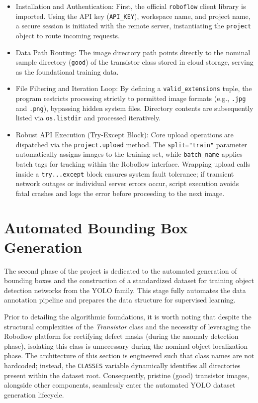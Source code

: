 \documentclass{article}
\begin{document}
\begin{itemize}
	\item Installation and Authentication: First, the official \texttt{roboflow} client library is imported. Using the API key (\texttt{API\_KEY}), workspace name, and project name, a secure session is initiated with the remote server, instantiating the \texttt{project} object to route incoming requests.
	\item Data Path Routing: The image directory path points directly to the nominal sample directory (\texttt{good}) of the transistor class stored in cloud storage, serving as the foundational training data.
	\item File Filtering and Iteration Loop: By defining a \texttt{valid\_extensions} tuple, the program restricts processing strictly to permitted image formats (e.g., \texttt{.jpg} and \texttt{.png}), bypassing hidden system files. Directory contents are subsequently listed via \texttt{os.listdir} and processed iteratively.
	\item Robust API Execution (Try-Except Block): Core upload operations are dispatched via the \texttt{project.upload} method. The \texttt{split="train"} parameter automatically assigns images to the training set, while \texttt{batch\_name} applies batch tags for tracking within the Roboflow interface. Wrapping upload calls inside a \texttt{try...except} block ensures system fault tolerance; if transient network outages or individual server errors occur, script execution avoids fatal crashes and logs the error before proceeding to the next image.
\end{itemize}


\section{Automated Bounding Box Generation}

The second phase of the project is dedicated to the automated generation of bounding boxes and the construction of a standardized dataset for training object detection networks from the YOLO family. This stage fully automates the data annotation pipeline and prepares the data structure for supervised learning.

Prior to detailing the algorithmic foundations, it is worth noting that despite the structural complexities of the \textit{Transistor} class and the necessity of leveraging the Roboflow platform for rectifying defect masks (during the anomaly detection phase), isolating this class is unnecessary during the nominal object localization phase. The architecture of this section is engineered such that class names are not hardcoded; instead, the \texttt{CLASSES} variable dynamically identifies all directories present within the dataset root. Consequently, pristine (good) transistor images, alongside other components, seamlessly enter the automated YOLO dataset generation lifecycle.
\end{document}
